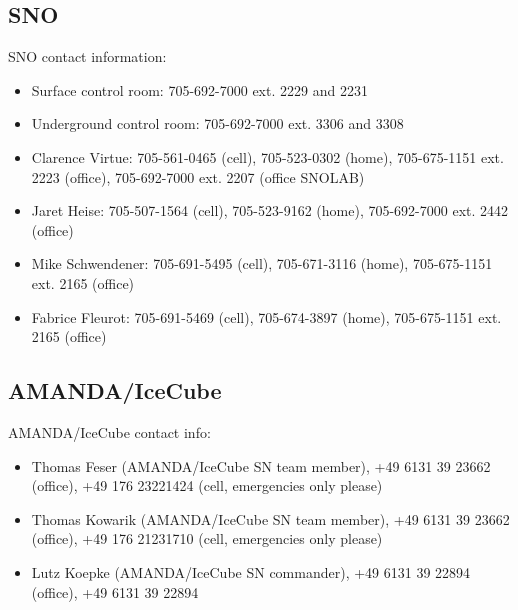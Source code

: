 \documentclass{article}
\begin{document}
\subsection{SNO}

SNO contact information:

\begin{itemize}
\item Surface control room: 705-692-7000 ext. 2229 and 2231

\item Underground control room: 705-692-7000 ext. 3306 and 3308

\item Clarence Virtue: 705-561-0465 (cell), 705-523-0302 (home), 705-675-1151 ext. 2223 (office), 705-692-7000 ext. 2207 (office SNOLAB)

\item Jaret Heise: 705-507-1564 (cell), 705-523-9162 (home), 705-692-7000 ext. 2442 (office)

\item Mike Schwendener: 705-691-5495 (cell), 705-671-3116 (home), 705-675-1151 ext. 2165 (office)

\item Fabrice Fleurot: 705-691-5469 (cell), 705-674-3897 (home), 705-675-1151 ext. 2165 (office) 

\end{itemize}


\subsection{AMANDA/IceCube}

AMANDA/IceCube contact info:

\begin{itemize}

\item Thomas Feser (AMANDA/IceCube SN team member), +49 6131 39 23662 (office), +49 176 23221424 (cell, emergencies only please)

\item Thomas Kowarik (AMANDA/IceCube SN team member), +49 6131 39 23662 (office), +49 176 21231710 (cell, emergencies only please)

\item Lutz Koepke (AMANDA/IceCube SN commander), +49 6131 39 22894 (office), +49 6131 39 22894 

\end{itemize}
\end{document}

